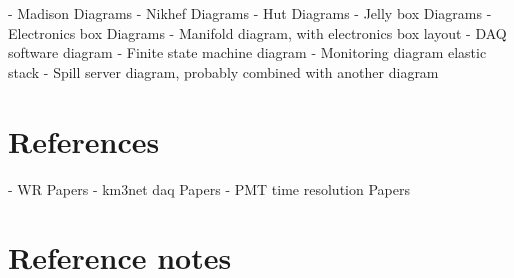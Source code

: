 - Madison Diagrams
- Nikhef Diagrams
- Hut Diagrams
- Jelly box Diagrams
- Electronics box Diagrams
- Manifold diagram, with electronics box layout
- DAQ software diagram
- Finite state machine diagram
- Monitoring diagram elastic stack
- Spill server diagram, probably combined with another diagram

\section{References}

- WR Papers
- km3net daq Papers
- PMT time resolution Papers

\section{Reference notes}